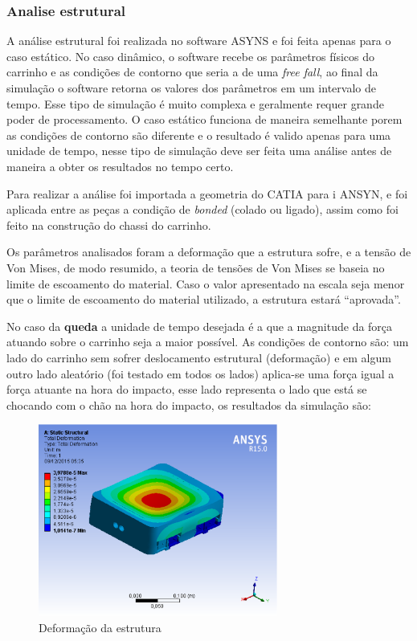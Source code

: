 \subsubsection{Analise estrutural}

A análise estrutural foi realizada no software ASYNS e foi feita apenas para o caso estático. No caso dinâmico, o software
recebe os parâmetros físicos do carrinho e as condições de contorno que seria a de uma \textit{free fall}, ao final da simulação o software
retorna os valores dos parâmetros em um intervalo de tempo. Esse tipo de simulação é muito complexa e geralmente requer grande poder
de processamento. O caso estático funciona de maneira semelhante porem as condições de contorno são diferente e o resultado é valido
apenas para uma unidade de tempo, nesse tipo de simulação deve ser feita uma análise antes de maneira a obter os resultados no tempo certo.

Para realizar a análise foi importada a geometria do CATIA para i ANSYN, e foi aplicada entre as peças a condição de \textit{bonded}
(colado ou ligado), assim como foi feito na construção do chassi do carrinho.

Os parâmetros analisados foram a deformação que a estrutura sofre, e a tensão de Von Mises, de modo resumido, a teoria de tensões
de Von Mises se baseia no limite de escoamento do material. Caso o valor apresentado na escala seja menor que o limite de escoamento
do material utilizado, a estrutura estará “aprovada”.

No caso da \textbf{queda} a unidade de tempo desejada é a que a magnitude da força atuando sobre o carrinho seja a maior possível. As condições
de contorno são: um lado do carrinho sem sofrer deslocamento estrutural (deformação) e em algum outro lado aleatório (foi testado em todos
os lados) aplica-se uma força igual a força atuante na hora do impacto, esse lado representa o lado que está se chocando com o chão na hora
do impacto, os resultados da simulação são:

\begin{figure}[H]
    \centering
    \includegraphics[width=0.7\textwidth]{figuras/queda_deformacao.eps}
    \caption{Deformação da estrutura}
    \label{fig:queda_deformacao}
\end{figure}

